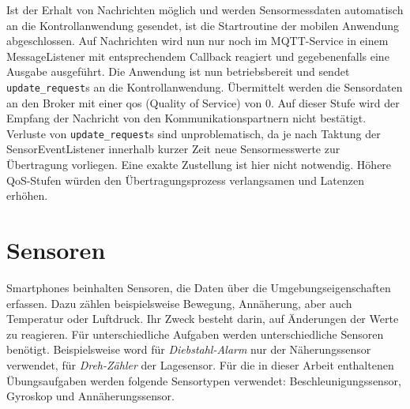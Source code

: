 \documentclass[11pt,a4paper]{report}
\begin{document}
Ist der Erhalt von Nachrichten möglich und werden Sensormessdaten automatisch an die Kontrollanwendung gesendet, ist die Startroutine der mobilen Anwendung abgeschlossen.
Auf Nachrichten wird nun nur noch im MQTT-Service in einem MessageListener mit entsprechendem Callback reagiert und gegebenenfalls eine Ausgabe ausgeführt.
Die Anwendung ist nun betriebsbereit und sendet \texttt{update\_request}s an die Kontrollanwendung.
Übermittelt werden die Sensordaten an den Broker mit einer \acrfull{qos} (Quality of Service) von 0.
Auf dieser Stufe wird der Empfang der Nachricht von den Kommunikationspartnern nicht bestätigt.
Verluste von \texttt{update\_request}s sind unproblematisch, da je nach Taktung der SensorEventListener innerhalb kurzer Zeit neue Sensormesswerte zur Übertragung vorliegen.
Eine exakte Zustellung ist hier nicht notwendig.
Höhere QoS-Stufen würden den Übertragungsprozess verlangsamen und Latenzen erhöhen.

\section{Sensoren}
Smartphones beinhalten Sensoren, die Daten über die Umgebungseigenschaften erfassen.
Dazu zählen beispielsweise Bewegung, Annäherung, aber auch Temperatur oder Luftdruck.
Ihr Zweck besteht darin, auf Änderungen der Werte zu reagieren.
Für unterschiedliche Aufgaben werden unterschiedliche Sensoren benötigt.
Beispielsweise word für \textit{Diebstahl-Alarm} nur der Näherungssensor verwendet, für \textit{Dreh-Zähler} der Lagesensor.
Für die in dieser Arbeit enthaltenen Übungsaufgaben werden folgende Sensortypen verwendet: Beschleunigungssensor, Gyroskop und Annäherungssensor.
\end{document}
